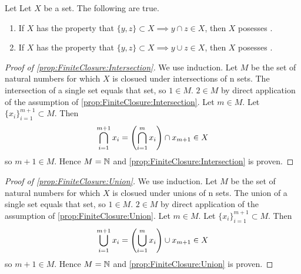 \begin{prop}
\label{prop:FiniteClosure}
    Let Let $X$ be a set. 
    The following are true. 
    \begin{enumerate}[label=(\roman*), ref={\ref{prop:FiniteClosure}.~\roman*}]
        \item \label{prop:FiniteClosure:Intersection}If $X$ has the property that $\{y,z\} \subset X \implies y \cap z \in X$, then $X$ 
        posesses \ClosureUnderFiniteIntersections. 
        \item \label{prop:FiniteClosure:Union}If $X$ has the property that $\{y,z\} \subset X \implies y \cup z \in X$, then $X$ posesses 
        \ClosureUnderFiniteUnions.
    \end{enumerate}
    \begin{proof}[Proof of \ref{prop:FiniteClosure:Intersection}]
        We use induction.
        Let $M$ be the set of natural numbers for which
        $X$ is closued under intersections of n sets. 
        The intersection of a single set equals that set, so $1 \in M$. 
        $2 \in M$ by direct application of the assumption of 
        \ref{prop:FiniteClosure:Intersection}. 
        Let $m \in M$. Let $\{x_i\}_{i=1}^{m+1} \subset M$. 
        Then 
        \begin{equation*}
            \bigcap\limits_{i=1}^{m+1} x_i = \left(  \bigcap\limits_{i=1}^m x_i\right) \cap x_{m+1} \in X
        \end{equation*}
        so $m+1 \in M$. 
        Hence $M= \mathbb{N}$ and \ref{prop:FiniteClosure:Intersection} is proven. 
    \end{proof}
    \begin{proof}[Proof of \ref{prop:FiniteClosure:Union}]
         We use induction.
        Let $M$ be the set of natural numbers for which
        $X$ is closued under unions of n sets. 
        The union of a single set equals that set, so $1 \in M$. 
        $2 \in M$ by direct application of the assumption of 
        \ref{prop:FiniteClosure:Union}. 
        Let $m \in M$. Let $\{x_i\}_{i=1}^{m+1} \subset M$. 
        Then 
        \begin{equation*}
            \bigcup\limits_{i=1}^{m+1} x_i = \left(  \bigcup\limits_{i=1}^m x_i\right) \cup x_{m+1} \in X
        \end{equation*}
        so $m+1 \in M$. 
        Hence $M= \mathbb{N}$ and \ref{prop:FiniteClosure:Union} is proven. 
    \end{proof}
\end{prop}
